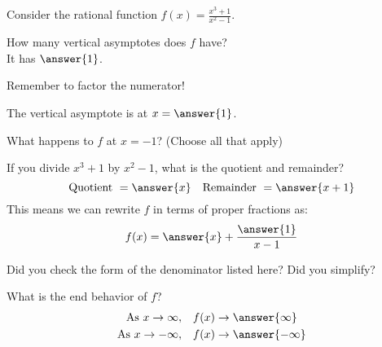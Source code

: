 \documentclass{ximera}
\author{Carl Stitz \and Jeff Zeager \and  Bobby Ramsey}
\begin{document}
Consider the rational function $\displaystyle f(x) = \frac{x^3+1}{x^2-1}$.

\begin{exercise}
	How many vertical asymptotes does $f$ have? \\
	
	It has $\answer{1}$.

	\begin{feedback}
		Remember to factor the numerator!
	\end{feedback}	
	\begin{exercise}
		The vertical asymptote is at $x = \answer{1}$.
		\begin{exercise}
			What happens to $f$ at $x=-1$? (Choose all that apply)
			\begin{selectAll}
			\end{selectAll}
		\end{exercise}	
	\end{exercise}
\end{exercise}
	
\begin{exercise}
	If you divide $x^3+1$ by $x^2-1$, what is the quotient and remainder?
	\[\text{Quotient} \,\, = \answer{x} \quad \text{Remainder} \,\, = \answer{x+1}\]
	This means we can rewrite $f$ in terms of proper fractions as:
	\[ f(x) = \answer{x} + \frac{\answer{1}}{x-1}  \]
	\begin{feedback}
		Did you check the form of the denominator listed here?  Did you simplify?
	\end{feedback}
	\begin{exercise}
		What is the end behavior of $f$?
		\begin{align*}
			\text{As} \,\, x \to \infty, &\quad f(x) \to \answer{\infty}\\
			\text{As} \,\, x \to -\infty, &\quad f(x) \to \answer{-\infty}\\
		\end{align*}	
	\end{exercise}	
\end{exercise}
	
\end{document}
